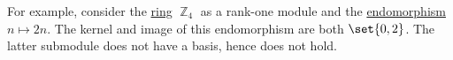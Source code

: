 \begin{example}\label{ex:z4_rank_nullity}
  For example, consider the \hyperref[thm:ring_of_integers_modulo]{ring} \( \BbbZ_4 \) as a rank-one module and the \hyperref[def:first_order_homomorphism_invertibility/endomorphism]{endomorphism} \( n \mapsto 2n \). The kernel and image of this endomorphism are both \( \set{ 0, 2 } \). The latter submodule does not have a basis, hence  does not hold.
\end{example}
